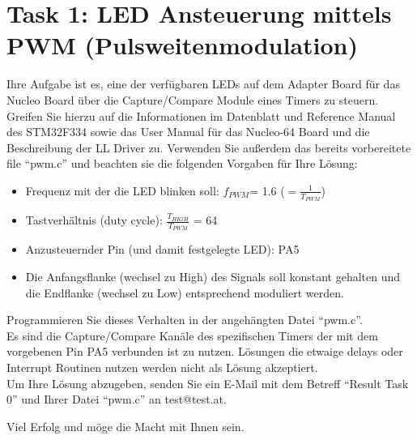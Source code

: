 \documentclass[a4paper,12pt]{article}
\begin{document}
\pagestyle{empty}
\setlength{\parindent}{0em}
\section*{Task 1: LED Ansteuerung mittels PWM (Pulsweitenmodulation)}

Ihre Aufgabe ist es, eine der verfügbaren LEDs auf dem Adapter Board für das Nucleo Board über die Capture/Compare Module eines Timers zu steuern. Greifen Sie hierzu auf die Informationen im Datenblatt \cite{data_sheet} und Reference Manual \cite{ref_manual} des STM32F334 sowie das User Manual für das Nucleo-64 Board \cite{nucleo_manual} und die Beschreibung der LL Driver \cite{driver_manual} zu. Verwenden Sie außerdem das bereits vorbereitete file \enquote{pwm.c} und beachten sie die folgenden Vorgaben für Ihre Lösung:

\begin{itemize}
\item Frequenz mit der die LED blinken soll: $f_{PWM}$= 1.6 ($=\frac{1}{T_{PWM}}$)
\item Tastverh\"altnis (duty cycle):  $\frac{T_{HIGH}}{T_{PWM}}$ = 64
\item Anzusteuernder Pin (und damit festgelegte LED): PA5
\item Die Anfangsflanke (wechsel zu High) des Signals soll konstant gehalten und die Endflanke (wechsel zu Low) entsprechend moduliert werden.
\end{itemize}
\vspace{0.3cm}

Programmieren Sie dieses Verhalten in der angeh\"angten Datei \enquote{pwm.c}.
\\

Es sind die Capture/Compare Kanäle des spezifischen Timers der mit dem vorgebenen Pin PA5 verbunden ist zu nutzen. Lösungen die etwaige delays oder Interrupt Routinen nutzen werden nicht als Lösung akzeptiert.
\\

Um Ihre L\"osung abzugeben, senden Sie ein E-Mail mit dem Betreff \enquote{Result Task 0} und Ihrer Datei \enquote{pwm.c}  an test@test.at.

\vspace{0.7cm}

Viel Erfolg und m\"oge die Macht mit Ihnen sein.

\printbibliography[heading=bibintoc]
\end{document}
